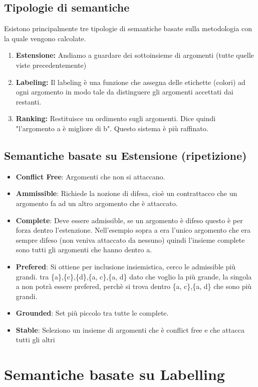 \section{Tipologie di semantiche}
Esistono principalmente tre tipologie di semantiche basate sulla metodologia
con la quale vengono calcolate.
\begin{enumerate}
    \item \textbf{Estensione:} Andiamo a guardare dei sottoinsieme di argomenti (tutte quelle viste precedentemente)
    \item \textbf{Labeling:} Il labeling è una funzione che assegna delle etichette (colori) ad ogni argomento in modo tale da distinguere gli argomenti accettati dai restanti.
    \item \textbf{Ranking:} Restituisce un ordimento sugli argomenti. Dice quindi "l’argomento a è migliore di b". Questo sistema è più raffinato.
\end{enumerate}
\section{Semantiche basate su Estensione (ripetizione)}
\begin{itemize}
    \item \textbf{Conflict Free}: Argomenti che non si attaccano.
    \item \textbf{Ammissible}: Richiede la nozione di difesa, cioè un contrattacco che un argomento fa ad un altro argomento che è attaccato.
    \item \textbf{Complete}: Deve essere admissible, se un argomento è difeso questo è per forza dentro l’estenzione. Nell’esempio sopra a era l’unico argomento che era sempre difeso (non veniva attaccato da nessuno) quindi l’insieme complete sono tutti gli argomenti che hanno dentro a.
    \item \textbf{Prefered}: Si ottiene per inclusione insiemistica, cerco le admissible più grandi. tra \{a\},\{c\},\{d\},\{a, c\},\{a, d\} dato che voglio la più grande, la singola {a} non potrà essere prefered, perchè si trova dentro \{a, c\},\{a, d\} che sono più grandi.
    \item \textbf{Grounded}: Set più piccolo tra tutte le complete.
    \item \textbf{Stable}: Seleziono un insieme di argomenti che è conflict free e che attacca tutti gli altri
\end{itemize}

\chapter{Semantiche basate su Labelling} \label{ch:Semantiche basate su Labelling}
